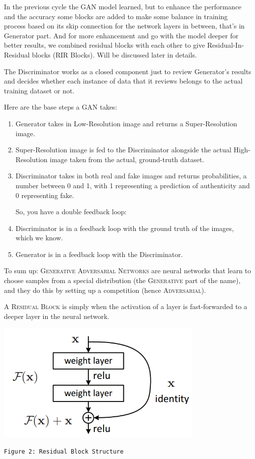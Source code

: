 \documentclass[12pt]{article}
\begin{document}
			In the previous cycle the GAN model learned, but to enhance the performance and the accuracy some blocks are added to make some balance in training process based on its skip connection for the network layers in between, that's in Generator part. And for more enhancement and go with the model deeper for better results, we combined residual blocks with each other to give Residual-In-Residual blocks (RIR Blocks). Will be discussed later in details.
			
			The Discriminator works as a closed component just to review Generator's results and decides whether each instance of data that it reviews belongs to the actual training dataset or not.
			
			Here are the base steps a GAN takes:
			\begin{enumerate}
				\item Generator takes in Low-Resolution image and returns a Super-Resolution image.
				\item Super-Resolution image is fed to the Discriminator alongside the actual High-Resolution image taken from the actual, ground-truth dataset.
				\item Discriminator takes in both real and fake images and returns probabilities, a number between 0 and 1, with 1 representing a prediction of authenticity and 0 representing fake.
				
				So, you have a double feedback loop:
				
				\item Discriminator is in a feedback loop with the ground truth of the images, which we know.
				\item Generator is in a feedback loop with the Discriminator.
			\end{enumerate}
			
			To sum up: \textsc{Generative Adversarial Networks} are neural networks that learn to choose samples from a special distribution (the \textsc{Generative} part of the name), and they do this by setting up a competition (hence \textsc{Adversarial}).
			
			A \textsc{Residual Block} is simply when the activation of a layer is fast-forwarded to a deeper layer in the neural network.
			\begin{center}
				\vspace{0.1in}
				\includegraphics[width=4in]{Images/ResidualStructure.png}
				
				\texttt{Figure 2: Residual Block Structure}
				\vspace{0.1in}
			\end{center}
			
\end{document}
